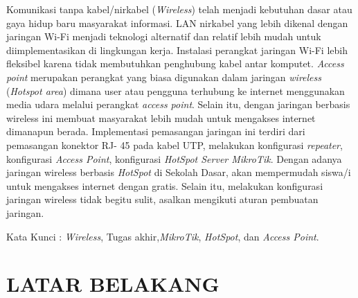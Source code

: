 \documentclass{jtetiproposalskripsi}
\begin{document}
\cover

\approvalpage


\begin{abstractind}
Komunikasi tanpa kabel/nirkabel (\emph{Wireless}) telah menjadi kebutuhan dasar atau gaya hidup baru masyarakat informasi. LAN nirkabel yang lebih dikenal dengan jaringan Wi-Fi menjadi teknologi alternatif dan relatif lebih mudah untuk diimplementasikan di lingkungan kerja. Instalasi perangkat jaringan Wi-Fi lebih fleksibel karena tidak membutuhkan penghubung kabel antar komputet. \emph{Access point} merupakan perangkat yang biasa digunakan dalam jaringan \emph{wireless} (\emph{Hotspot area}) dimana user atau pengguna terhubung ke internet menggunakan media udara melalui perangkat \emph{access point}. Selain itu, dengan jaringan berbasis wireless ini membuat masyarakat lebih mudah untuk mengakses internet dimanapun berada. Implementasi pemasangan jaringan ini terdiri dari pemasangan konektor RJ- 45 pada kabel UTP, melakukan konfigurasi \emph{repeater}, konfigurasi \emph{Access Point}, konfigurasi \emph{HotSpot Server MikroTik}. Dengan adanya jaringan wireless berbasis \emph{HotSpot} di Sekolah Dasar, akan mempermudah siswa/i untuk mengakses internet dengan gratis. Selain itu, melakukan konfigurasi jaringan wireless tidak begitu sulit, asalkan mengikuti aturan pembuatan jaringan.
\bigskip

Kata Kunci : \emph{Wireless}, Tugas akhir,\emph{MikroTik}, \emph{HotSpot}, dan \emph{Access Point}.

\end{abstractind}

\tableofcontents
{}
\clearpage{}\setcounter{page}{1}

\chapter{LATAR BELAKANG}
\end{document}
